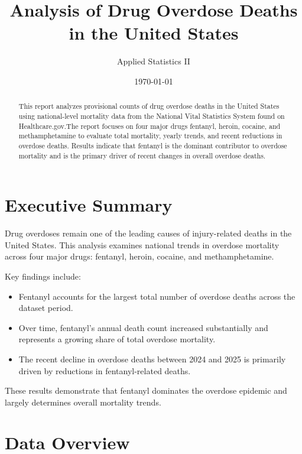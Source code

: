 \documentclass[12pt]{article}
\title{\textbf{Analysis of Drug Overdose Deaths in the United States}}
\author{Applied Statistics II}
\date{\today}
\begin{document}
	
	\maketitle
	\thispagestyle{empty}
	
	\begin{abstract}
		This report analyzes provisional counts of drug overdose deaths in the United States using national-level mortality data from the National Vital Statistics System found on Healthcare.gov.The report focuses on four major drugs fentanyl, heroin, cocaine, and methamphetamine to evaluate total mortality, yearly trends, and recent reductions in overdose deaths. Results indicate that fentanyl is the dominant contributor to overdose mortality and is the primary driver of recent changes in overall overdose deaths.
	\end{abstract}
	
	\newpage
	
	\tableofcontents
	\newpage
	
	\section{Executive Summary}
	
	Drug overdoses remain one of the leading causes of injury-related deaths in the United States. This analysis examines national trends in overdose mortality across four major drugs: fentanyl, heroin, cocaine, and methamphetamine.
	
	Key findings include:
	
	\begin{itemize}
		\item Fentanyl accounts for the largest total number of overdose deaths across the dataset period.
		\item Over time, fentanyl's annual death count increased substantially and represents a growing share of total overdose mortality.
		\item The recent decline in overdose deaths between 2024 and 2025 is primarily driven by reductions in fentanyl-related deaths.
	\end{itemize}
	
	These results demonstrate that fentanyl dominates the overdose epidemic and largely determines overall mortality trends.
	
	\section{Data Overview}
	
\end{document}
